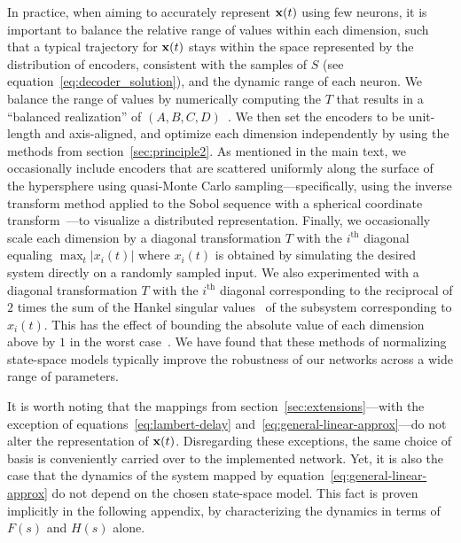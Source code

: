 In practice, when aiming to accurately represent $\mathbf{x}(t)$ using few neurons, it is important to balance the relative range of values within each dimension, such that a typical trajectory for $\mathbf{x}(t)$ stays within the space represented by the distribution of encoders, consistent with the samples of $S$ (see equation~\ref{eq:decoder_solution}), and the dynamic range of each neuron.
We balance the range of values by numerically computing the $T$ that results in a ``balanced realization'' of $(A\text{,}\, B\text{,}\, C\text{,}\, D)$~\citep{laub1987computation, perevapproximation}.
We then set the encoders to be unit-length and axis-aligned, and optimize each dimension independently by using the methods from section~\ref{sec:principle2}.
As mentioned in the main text, we occasionally include encoders that are scattered uniformly along the surface of the hypersphere using quasi-Monte Carlo sampling---specifically, using the inverse transform method applied to the Sobol sequence with a spherical coordinate transform~\citep{fang1994, voelker2016b}---to visualize a distributed representation.
Finally, we occasionally scale each dimension by a diagonal transformation $T$ with the $i^{\text{th}}$ diagonal equaling $\max_t \left| x_i(t) \right|$ where $x_i(t)$ is obtained by simulating the desired system directly on a randomly sampled input.
We also experimented with a diagonal transformation $T$ with the $i^{\text{th}}$ diagonal corresponding to the reciprocal of $2$ times the sum of the Hankel singular values~\citep{glover1987bounds} of the subsystem corresponding to $x_i(t)$.
This has the effect of bounding the absolute value of each dimension above by $1$ in the worst case~\citep{khaisongkram2007computing}.
We have found that these methods of normalizing state-space models typically improve the robustness of our networks across a wide range of parameters.


It is worth noting that the mappings from section~\ref{sec:extensions}---with the exception of equations~\ref{eq:lambert-delay} and~\ref{eq:general-linear-approx}---do not alter the representation of $\mathbf{x}(t)$.
Disregarding these exceptions, the same choice of basis is conveniently carried over to the implemented network.
Yet, it is also the case that the dynamics of the system mapped by equation~\ref{eq:general-linear-approx} do not depend on the chosen state-space model.
This fact is proven implicitly in the following appendix, by characterizing the dynamics in terms of $F(s)$ and $H(s)$ alone.

